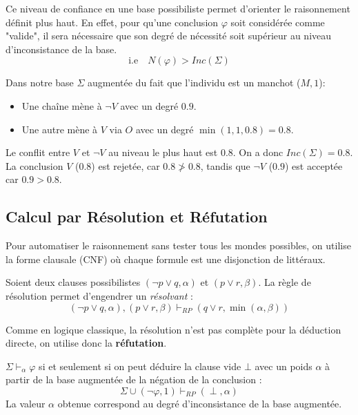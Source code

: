 \begin{proposition}
    Ce niveau de confiance en une base possibiliste permet d'orienter le raisonnement définit plus 
    haut. En effet, pour qu'une conclusion $ \varphi$ soit considérée comme "valide", il sera 
    nécessaire que son degré de nécessité soit supérieur au niveau d'inconsistance de la base. 
        $$ \text{i.e} \quad N( \varphi) > Inc( \Sigma) $$  
\end{proposition}


\begin{example}
    Dans notre base $\Sigma$ augmentée du fait que l'individu est un manchot ($M, 1$):
    \begin{itemize}
        \item Une chaîne mène à $\neg V$ avec un degré $0.9$.
        \item Une autre mène à $V$ via $O$ avec un degré $\min(1, 1, 0.8) = 0.8$.
    \end{itemize}
    Le conflit entre $V$ et $\neg V$ au niveau le plus haut est $0.8$.
    On a donc $Inc(\Sigma) = 0.8$. 
    La conclusion $V$ ($0.8$) est rejetée, car $0.8 \ngtr 0.8$, tandis que $\neg V$ ($0.9$) est acceptée car $0.9 > 0.8$.
\end{example}

\subsection{Calcul par Résolution et Réfutation}

Pour automatiser le raisonnement sans tester tous les mondes possibles, on utilise la forme clausale 
(CNF) où chaque formule est une disjonction de littéraux.

\begin{definition} 
    Soient deux clauses possibilistes $(\lnot p \lor q, \alpha)$ et $(p \lor r, \beta)$. 
    La règle de résolution permet d'engendrer un \emph{résolvant} : 
    \begin{equation} 
        (\neg p \vee q, \alpha), (p \vee r, \beta) \vdash_{RP} (q \vee r, \min(\alpha, \beta)) 
    \end{equation} 
\end{definition}

Comme en logique classique, la résolution n'est pas complète pour la déduction directe, on utilise donc la \textbf{réfutation}.

\begin{theorem} 
    $ \Sigma \vdash_\alpha \varphi$  si et seulement si on peut déduire la clause vide $ \bot$  avec un 
    poids $ \alpha$ à partir de la base augmentée de la négation de la conclusion : 
    \begin{equation} 
        \Sigma \cup { (\neg \varphi, 1) } \vdash_{RP} (\perp, \alpha) 
    \end{equation} 
    La valeur $ \alpha$ obtenue correspond au degré d'inconsistance de la base augmentée.
\end{theorem}

